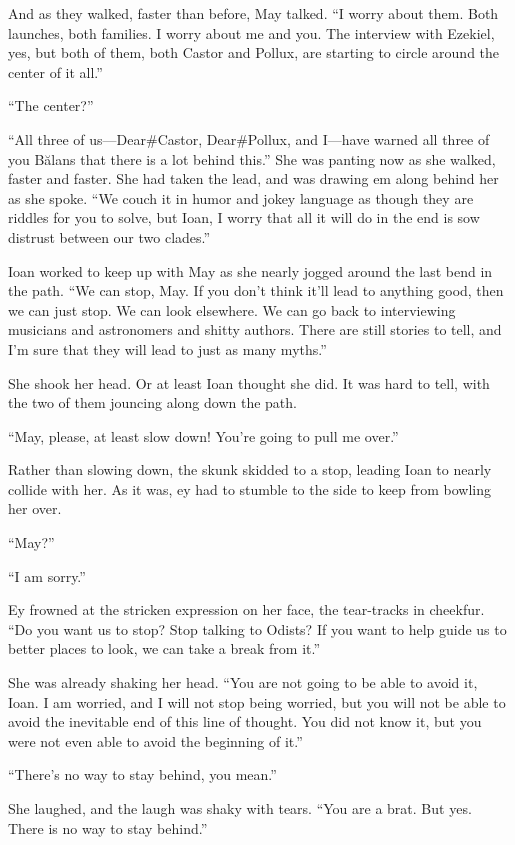And as they walked, faster than before, May talked. ``I worry about them. Both launches, both families. I worry about me and you. The interview with Ezekiel, yes, but both of them, both Castor and Pollux, are starting to circle around the center of it all.''

``The center?''

``All three of us---Dear\#Castor, Dear\#Pollux, and I---have warned all three of you Bălans that there is a lot behind this.'' She was panting now as she walked, faster and faster. She had taken the lead, and was drawing em along behind her as she spoke. ``We couch it in humor and jokey language as though they are riddles for you to solve, but Ioan, I worry that all it will do in the end is sow distrust between our two clades.''

Ioan worked to keep up with May as she nearly jogged around the last bend in the path. ``We can stop, May. If you don't think it'll lead to anything good, then we can just stop. We can look elsewhere. We can go back to interviewing musicians and astronomers and shitty authors. There are still stories to tell, and I'm sure that they will lead to just as many myths.''

She shook her head. Or at least Ioan thought she did. It was hard to tell, with the two of them jouncing along down the path.

``May, please, at least slow down! You're going to pull me over.''

Rather than slowing down, the skunk skidded to a stop, leading Ioan to nearly collide with her. As it was, ey had to stumble to the side to keep from bowling her over.

``May?''

``I am sorry.''

Ey frowned at the stricken expression on her face, the tear-tracks in cheekfur. ``Do you want us to stop? Stop talking to Odists? If you want to help guide us to better places to look, we can take a break from it.''

She was already shaking her head. ``You are not going to be able to avoid it, Ioan. I am worried, and I will not stop being worried, but you will not be able to avoid the inevitable end of this line of thought. You did not know it, but you were not even able to avoid the beginning of it.''

``There's no way to stay behind, you mean.''

She laughed, and the laugh was shaky with tears. ``You are a brat. But yes. There is no way to stay behind.''

